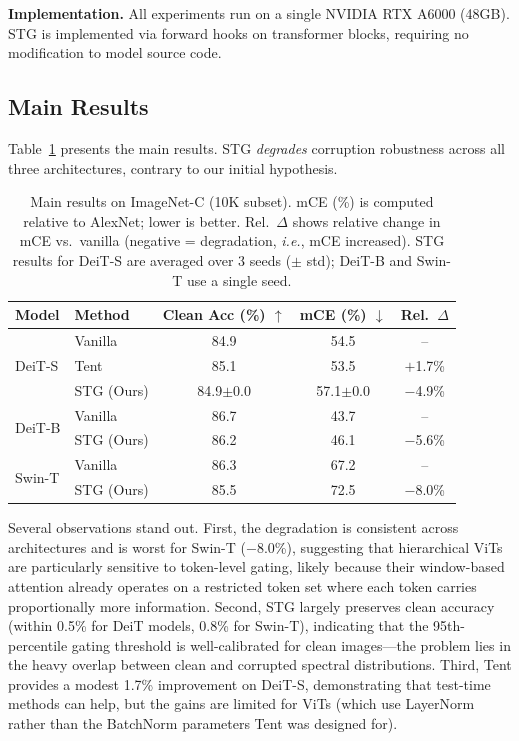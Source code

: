 \documentclass{article}
\newcommand{\methodname}{STG}
\newcommand{\ie}{\emph{i.e.}}
\begin{document}
\textbf{Implementation.} All experiments run on a single NVIDIA RTX A6000 (48GB). \methodname{} is implemented via forward hooks on transformer blocks, requiring no modification to model source code.

\subsection{Main Results}
\label{sec:main}

Table~\ref{tab:main} presents the main results. \methodname{} \emph{degrades} corruption robustness across all three architectures, contrary to our initial hypothesis.

\begin{table}[t]
\centering
\caption{Main results on ImageNet-C (10K subset). mCE (\%) is computed relative to AlexNet; lower is better. Rel.~$\Delta$ shows relative change in mCE vs.\ vanilla (negative = degradation, \ie, mCE increased). STG results for DeiT-S are averaged over 3 seeds ($\pm$ std); DeiT-B and Swin-T use a single seed.}
\label{tab:main}
\begin{tabular}{llccc}
\toprule
Model & Method & Clean Acc (\%) $\uparrow$ & mCE (\%) $\downarrow$ & Rel.~$\Delta$ \\
\midrule
\multirow{3}{*}{DeiT-S} & Vanilla & 84.9 & 54.5 & -- \\
 & Tent & 85.1 & 53.5 & $+$1.7\% \\
 & \methodname{} (Ours) & 84.9$\pm$0.0 & 57.1$\pm$0.0 & $-$4.9\% \\
\midrule
\multirow{2}{*}{DeiT-B} & Vanilla & 86.7 & 43.7 & -- \\
 & \methodname{} (Ours) & 86.2 & 46.1 & $-$5.6\% \\
\midrule
\multirow{2}{*}{Swin-T} & Vanilla & 86.3 & 67.2 & -- \\
 & \methodname{} (Ours) & 85.5 & 72.5 & $-$8.0\% \\
\bottomrule
\end{tabular}
\end{table}

Several observations stand out. First, the degradation is consistent across architectures and is worst for Swin-T ($-$8.0\%), suggesting that hierarchical ViTs are particularly sensitive to token-level gating, likely because their window-based attention already operates on a restricted token set where each token carries proportionally more information. Second, \methodname{} largely preserves clean accuracy (within 0.5\% for DeiT models, 0.8\% for Swin-T), indicating that the 95th-percentile gating threshold is well-calibrated for clean images---the problem lies in the heavy overlap between clean and corrupted spectral distributions. Third, Tent provides a modest 1.7\% improvement on DeiT-S, demonstrating that test-time methods can help, but the gains are limited for ViTs (which use LayerNorm rather than the BatchNorm parameters Tent was designed for).
\end{document}
